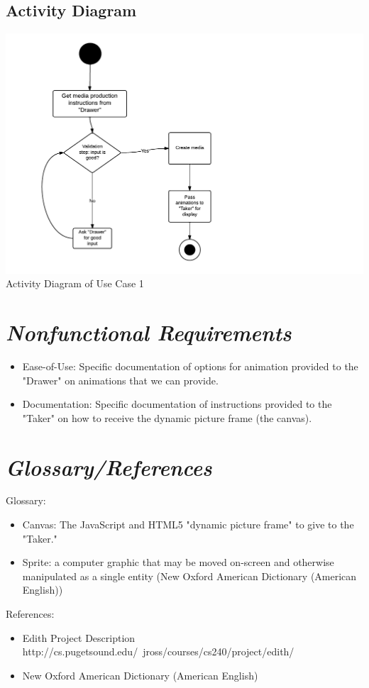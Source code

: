 \documentclass[12pt]{article}
\begin{document}
\subsection{Activity Diagram}
\includegraphics[scale=.45]{Activity_Diagram.png}
\\Activity Diagram of Use Case 1


\section{\emph{Nonfunctional Requirements}}

\begin{itemize}
	\item Ease-of-Use: Specific documentation of options for animation provided to the "Drawer" on animations that we can provide.
	\item Documentation: Specific documentation of instructions provided to the "Taker" on how to receive the dynamic picture frame (the canvas).
\end{itemize}

\section{\emph{Glossary/References}}
Glossary:
\begin{itemize}
	\item Canvas: The JavaScript and HTML5 "dynamic picture frame" to give to the "Taker."
	\item Sprite:  a computer graphic that may be moved on-screen and otherwise manipulated as a single entity (New Oxford American Dictionary (American English))
\end{itemize}

\noindent References: 
\begin{itemize}
	\item Edith Project Description http://cs.pugetsound.edu/~jross/courses/cs240/project/edith/
	\item New Oxford American Dictionary (American English)
\end{itemize}
\end{document}
